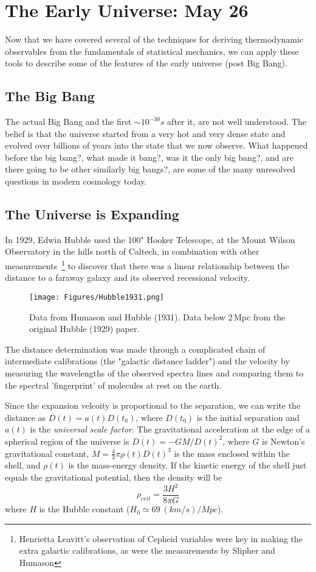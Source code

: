 \section{The Early Universe: May 26}
Now that we have covered several of the techniques for deriving thermodynamic observables from the fundamentals of statistical mechanics, we can apply these tools to describe some of the features of the early universe (post Big Bang).


\subsection{The Big Bang}
The actual Big Bang and the first $\sim 10^{-30} s$ after it, are not well understood. The belief is that the universe started from a very hot and very dense state and evolved over billions of years into the state that we now observe. What happened before the big bang?, what made it bang?, was it the only big bang?, and are there going to be other similarly big bangs?, are some of the many unresolved questions in modern cosmology today.

\subsection{The Universe is Expanding}
In 1929, Edwin Hubble used the 100" Hooker Telescope, at the Mount Wilson Observatory in the hills north of Caltech, in combination with other
measurements~\footnote{Henrietta Leavitt's observation of Cepheid variables were key in making the extra galactic calibrations, as were the measurements by
Slipher and Humason} to discover that there was a linear relationship between the distance to a faraway galaxy and its observed recessional velocity.
\begin{figure}[h]
\centering
\texttt{[image: Figures/Hubble1931.png]}
\caption{Data from Humason and Hubble (1931). Data below 2\,Mpc from
	the original Hubble (1929) paper.}
\label{fig:Hubble}
\end{figure}
The distance determination was made through a complicated chain of intermediate calibrations (the "galactic distance ladder") and the velocity by measuring the wavelengths of the observed spectra lines and comparing them to the spectral 'fingerprint' of molecules at rest on the earth.

Since the expansion velcoity is proportional to the separation, we 
can write the distance as $D(t) = a(t) D(t_0)$, where $D(t_0)$ is 
the initial separation and $a(t)$ is the \textit{universal scale factor}.
The gravitational acceleration at the edge of a spherical region of
the universe is $\ddot{D(t)} = -G M / D(t)^2$, where $G$ is Newton's gravitational constant, $M = \frac{4}{3} \pi \rho(t) D(t)^3$ is the mass enclosed within the shell, and $\rho(t)$ is the mass-energy density. If the kinetic energy of the shell just equals the gravitational potential, then the density will be
\begin{equation}
\rho_{crit} = \frac{3 H^2}{8 \pi G}
\end{equation}
where $H$ is the Hubble constant ($H_0 \simeq 69~(km/s)/Mpc$). 

